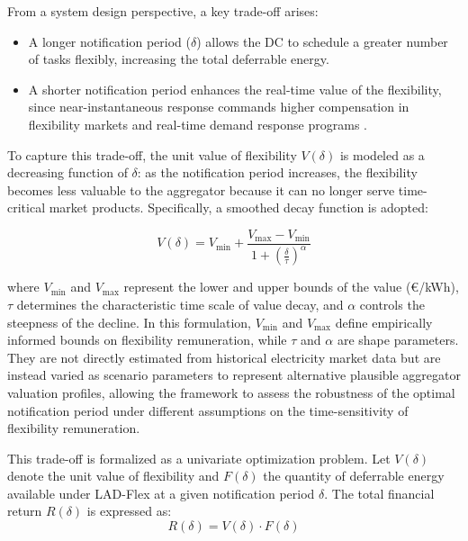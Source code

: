 \documentclass[preprint,12pt]{elsarticle}
\begin{document}
From a system design perspective, a key trade-off arises:
\begin{itemize}
    \item A longer notification period (\( \delta \)) allows the DC to schedule a greater number of tasks flexibly, increasing the total deferrable energy.
    \item A shorter notification period enhances the real-time value of the flexibility, since near-instantaneous response commands higher compensation in flexibility markets \cite{Villar2018} and real-time demand response programs \cite{Conejo2010, MohsenianRad2010}.
\end{itemize}

To capture this trade-off, the unit value of flexibility \( V(\delta) \) is modeled as a decreasing function of \( \delta \): as the notification period increases, the flexibility becomes less valuable to the aggregator because it can no longer serve time-critical market products. Specifically, a smoothed decay function is adopted:

\begin{equation}
V(\delta) = V_{\min} + \frac{V_{\max} - V_{\min}}{1 + \left( \frac{\delta}{\tau} \right)^{\alpha}}
\label{smooth_decay}
\end{equation}

where \( V_{\min} \) and \( V_{\max} \) represent the lower and upper bounds of the value (€/kWh), \( \tau \) determines the characteristic time scale of value decay, and \( \alpha \) controls the steepness of the decline. In this formulation, \( V_{\min} \) and \( V_{\max} \) define empirically informed bounds on flexibility remuneration, while \( \tau \) and \( \alpha \) are shape parameters. They are not directly estimated from historical electricity market data but are instead varied as scenario parameters to represent alternative plausible aggregator valuation profiles, allowing the framework to assess the robustness of the optimal notification period under different assumptions on the time-sensitivity of flexibility remuneration.

This trade-off is formalized as a univariate optimization problem. Let \( V(\delta) \) denote the unit value of flexibility and \( F(\delta) \) the quantity of deferrable energy available under LAD-Flex at a given notification period \( \delta \). The total financial return \( R(\delta) \) is expressed as:
\begin{equation} \label{eq:max_returns}
    R(\delta) = V(\delta) \cdot F(\delta)
\end{equation}
\end{document}
